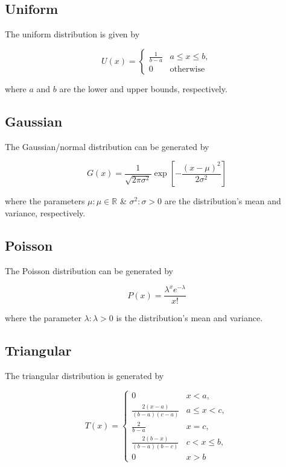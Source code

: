 \subsection{Uniform}
\label{ssec:random-distro-uniform}
The uniform distribution is given by

\begin{equation}
\label{eq:random-uniform}
U(x) = \begin{cases}
\frac{1}{b - a} & a \leq x \leq b, \\
0 & \mathrm{otherwise}
\end{cases}
\end{equation}

\noindent where $a$ and $b$ are the lower and upper bounds, respectively.

\subsection{Gaussian}
\label{ssec:random-distro-gaussian}
The Gaussian/normal distribution can be generated by

\begin{equation}
\label{eq:random-gaussian}
G(x) = \frac{1}{\sqrt{2\pi\sigma^2}} \exp[-\frac{(x - \mu)^2}{2\sigma^2}]
\end{equation}

\noindent where the parameters $\mu: \mu \in \mathbb{R}$ \& $\sigma^2: \sigma > 0$ are the distribution's mean and variance, respectively.

\subsection{Poisson}
\label{ssec:random-distro-poisson}
The Poisson distribution can be generated by

\begin{equation}
\label{eq:random-poisson}
P(x) = \frac{\lambda^x e^{-\lambda}}{x!}
\end{equation}

\noindent where the parameter $\lambda: \lambda > 0$ is the distribution's mean and variance.

\subsection{Triangular}
\label{ssec:random-distro-triangular}
The triangular distribution is generated by

\begin{equation}
\label{eq:random-triangular}
T(x) = \begin{cases}
0 & x < a, \\
\frac{2(x-a)}{(b - a)(c - a)} & a \leq x < c, \\
\frac{2}{b - a} & x = c, \\
\frac{2(b - x)}{(b - a)(b - c)} & c < x \leq b, \\
0 & x > b
\end{cases}
\end{equation}

